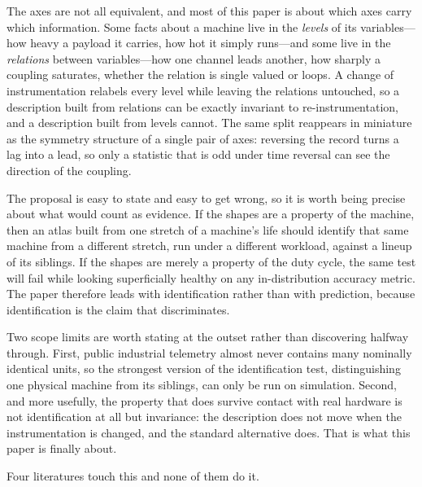\documentclass[11pt]{article}
\begin{document}
The axes are not all equivalent, and most of this paper is about which axes
carry which information. Some facts about a machine live in the \emph{levels}
of its variables---how heavy a payload it carries, how hot it simply runs---and
some live in the \emph{relations} between variables---how one channel leads
another, how sharply a coupling saturates, whether the relation is single
valued or loops. A change of instrumentation relabels every level while
leaving the relations untouched, so a description built from relations can be
exactly invariant to re-instrumentation, and a description built from levels
cannot. The same split reappears in miniature as the symmetry structure of a
single pair of axes: reversing the record turns a lag into a lead, so only a
statistic that is odd under time reversal can see the direction of the
coupling.

The proposal is easy to state and easy to get wrong, so it is worth being
precise about what would count as evidence. If the shapes are a property of
the machine, then an atlas built from one stretch of a machine's life should
identify that same machine from a different stretch, run under a different
workload, against a lineup of its siblings. If the shapes are merely a property
of the duty cycle, the same test will fail while looking superficially healthy
on any in-distribution accuracy metric. The paper therefore leads with identification
rather than with prediction, because identification is the claim that
discriminates.

Two scope limits are worth stating at the outset rather than discovering
halfway through. First, public industrial telemetry almost never contains many
nominally identical units, so the strongest version of the identification test,
distinguishing one physical machine from its siblings, can only be run on
simulation. Second, and more usefully, the property that does survive contact
with real hardware is not identification at all but invariance: the
description does not move when the instrumentation is changed, and the standard
alternative does. That is what this paper is finally about.

Four literatures touch this and none of them do it.
\end{document}
